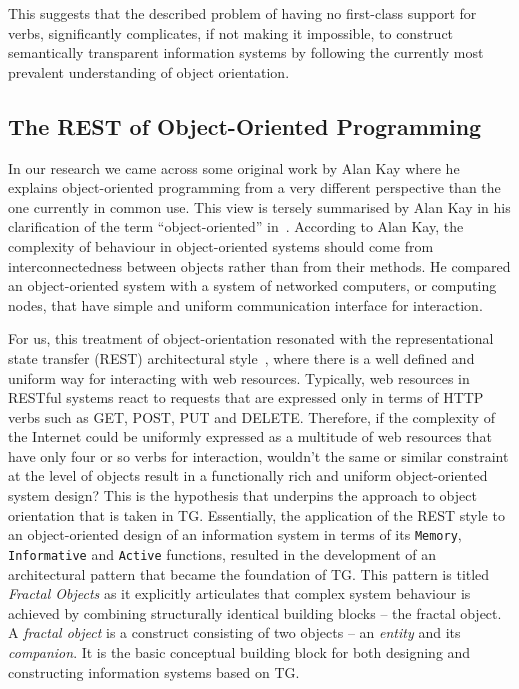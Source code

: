 \documentclass[a4paper,12pt,oneside,openright,final]{memoir} %
\begin{document}
	This suggests that the described problem of having no first-class support for verbs, significantly complicates, if not making it impossible, to construct semantically transparent information systems by following the currently most prevalent understanding of object orientation.

\subsection*{The REST of Object-Oriented Programming}	
	
	In our research we came across some original work by Alan Kay where he explains object-oriented programming from a very different perspective than the one currently in common use.
	This view is tersely summarised by Alan Kay in his clarification of the term ``object-oriented'' in~\cite{Kay2003}.
	According to Alan Kay, the complexity of behaviour in object-oriented systems should come from interconnectedness between objects rather than from their methods.
	He compared an object-oriented system with a system of networked computers, or computing nodes, that have simple and uniform communication interface for interaction.
	
	For us, this treatment of object-orientation resonated with the representational state transfer (REST) architectural style~\cite{Fielding2000}, where there is a well defined and uniform way for interacting with web resources.
	Typically, web resources in RESTful systems react to requests that are expressed only in terms of HTTP verbs such as GET, POST, PUT and DELETE.
	Therefore, if the complexity of the Internet could be uniformly expressed as a multitude of web resources that have only four or so verbs for interaction, wouldn't the same or similar constraint at the level of objects result in a functionally rich and uniform object-oriented system design?
	This is the hypothesis that underpins the approach to object orientation that is taken in TG.
	Essentially, the application of the REST style to an object-oriented design of an information system in terms of its \texttt{Memory}, \texttt{Informative} and \texttt{Active} functions, resulted in the development of an architectural pattern that became the foundation of TG.
	This pattern is titled \emph{Fractal Objects} as it explicitly articulates that complex system behaviour is achieved by combining structurally identical building blocks -- the fractal object.
	A \emph{fractal object} is a construct consisting of two objects -- an \emph{entity} and its \emph{companion}.
	It is the basic conceptual building block for both designing and constructing information systems based on TG.
	
\end{document}
